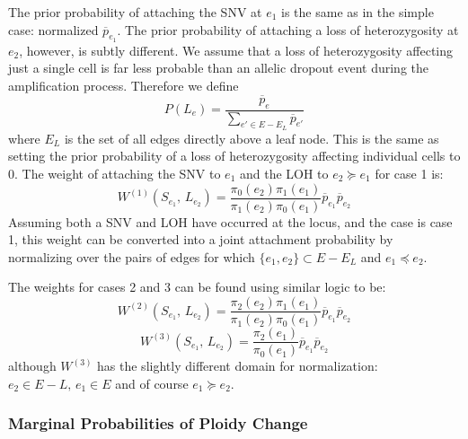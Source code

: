 \documentclass[../../main.tex]{subfiles}
\begin{document}
The prior probability of attaching the SNV at $e_1$ is the same as in the simple case: normalized $\overline{p}_{e_1}$.
The prior probability of attaching a loss of heterozygosity at $e_2$, however, is subtly different.
We assume that a loss of heterozygosity affecting just a single cell is far less probable than an allelic dropout event during the amplification process.
Therefore we define
\begin{equation*}
    P(L_{e}) = \frac{\overline{p}_e}{\sum_{e'\in E-E_L}\overline{p}_{e'}}
\end{equation*}
where $E_L$ is the set of all edges directly above a leaf node.
This is the same as setting the prior probability of a loss of heterozygosity affecting individual cells to 0.
The weight of attaching the SNV to $e_1$ and the LOH to $e_2\succeq e_1$ for case 1 is:
\begin{equation}
    W^{(1)}(S_{e_1},\,L_{e_2}) = \frac{\pi_0(e_2)\pi_1(e_1)}{\pi_1(e_2)\pi_0(e_1)}\overline{p}_{e_1}\overline{p}_{e_2}
\end{equation}
Assuming both a SNV and LOH have occurred at the locus, and the case is case 1, this weight can be converted into a joint attachment probability by normalizing over the pairs of edges for which $\{e_1,e_2\}\subset E-E_L$ and $e_1\preceq e_2$.

The weights for cases 2 and 3 can be found using similar logic to be:
\begin{equation}
    W^{(2)}(S_{e_1},\,L_{e_2}) = \frac{\pi_2(e_2)\pi_1(e_1)}{\pi_1(e_2)\pi_0(e_1)}\overline{p}_{e_1}\overline{p}_{e_2}
\end{equation}
\begin{equation}
    W^{(3)}(S_{e_1},\,L_{e_2}) = \frac{\pi_2(e_1)}{\pi_0(e_1)}\overline{p}_{e_1}\overline{p}_{e_2}
\end{equation}
although $W^{(3)}$ has the slightly different domain for normalization: $e_2\in E-L,\,e_1\in E$ and of course $e_1\succeq e_2$.

\subsubsection*{Marginal Probabilities of Ploidy Change}
\end{document}
